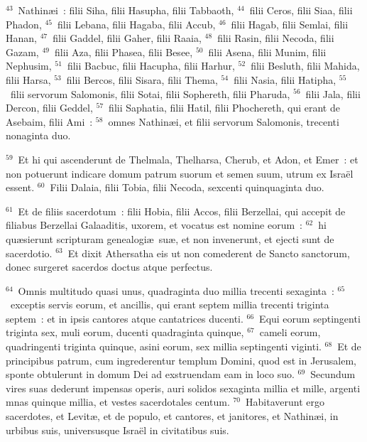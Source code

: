${}^{43}$~Nathin\ae i~: filii Siha, filii Hasupha, filii Tabbaoth,
${}^{44}$~filii Ceros, filii Siaa, filii Phadon,
${}^{45}$~filii Lebana, filii Hagaba, filii Accub,
${}^{46}$~filii Hagab, filii Semlai, filii Hanan,
${}^{47}$~filii Gaddel, filii Gaher, filii Raaia,
${}^{48}$~filii Rasin, filii Necoda, filii Gazam,
${}^{49}$~filii Aza, filii Phasea, filii Besee,
${}^{50}$~filii Asena, filii Munim, filii Nephusim,
${}^{51}$~filii Bacbuc, filii Hacupha, filii Harhur,
${}^{52}$~filii Besluth, filii Mahida, filii Harsa,
${}^{53}$~filii Bercos, filii Sisara, filii Thema,
${}^{54}$~filii Nasia, filii Hatipha,
${}^{55}$~filii servorum Salomonis, filii Sotai, filii Sophereth, filii Pharuda,
${}^{56}$~filii Jala, filii Dercon, filii Geddel,
${}^{57}$~filii Saphatia, filii Hatil, filii Phochereth, qui erant de Asebaim, filii Ami~:
${}^{58}$~omnes Nathin\ae i, et filii servorum Salomonis, trecenti nonaginta duo.


${}^{59}$~Et hi qui ascenderunt de Thelmala, Thelharsa, Cherub, et Adon, et Emer~: et non potuerunt indicare domum patrum suorum et semen suum, utrum ex Isra\"el essent.
${}^{60}$~Filii Dalaia, filii Tobia, filii Necoda, sexcenti quinquaginta duo.


${}^{61}$~Et de filiis sacerdotum~: filii Hobia, filii Accos, filii Berzellai, qui accepit de filiabus Berzellai Galaaditis, uxorem, et vocatus est nomine eorum~:
${}^{62}$~hi qu\ae sierunt scripturam genealogi\ae\ su\ae , et non invenerunt, et ejecti sunt de sacerdotio.
${}^{63}$~Et dixit Athersatha eis ut non comederent de Sancto sanctorum, donec surgeret sacerdos doctus atque perfectus.


${}^{64}$~Omnis multitudo quasi unus, quadraginta duo millia trecenti sexaginta~:
${}^{65}$~exceptis servis eorum, et ancillis, qui erant septem millia trecenti triginta septem~: et in ipsis cantores atque cantatrices ducenti.
${}^{66}$~Equi eorum septingenti triginta sex, muli eorum, ducenti quadraginta quinque,
${}^{67}$~cameli eorum, quadringenti triginta quinque, asini eorum, sex millia septingenti viginti.
${}^{68}$~Et de principibus patrum, cum ingrederentur templum Domini, quod est in Jerusalem, sponte obtulerunt in domum Dei ad exstruendam eam in loco suo.
${}^{69}$~Secundum vires suas dederunt impensas operis, auri solidos sexaginta millia et mille, argenti mnas quinque millia, et vestes sacerdotales centum.
${}^{70}$~Habitaverunt ergo sacerdotes, et Levit\ae , et de populo, et cantores, et janitores, et Nathin\ae i, in urbibus suis, universusque Isra\"el in civitatibus suis.

